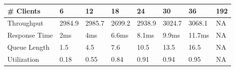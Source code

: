 \begin{tabular}{llllllll}
\hline
\# Clients & 6 & 12 & 18 & 24 & 30 & 36 & 192\\
\hline
Throughput & 2984.9 & 2985.7 & 2699.2 & 2938.9 & 3024.7 & 3068.1 & NA\\
Response Time & 2ms & 4ms & 6.6ms & 8.1ms & 9.9ms & 11.7ms & NA\\
Queue Length & 1.5 & 4.5 & 7.6 & 10.5 & 13.5 & 16.5 & NA\\
Utilization & 0.18 & 0.55 & 0.84 & 0.91 & 0.94 & 0.95 & NA\\
\hline
\end{tabular}
